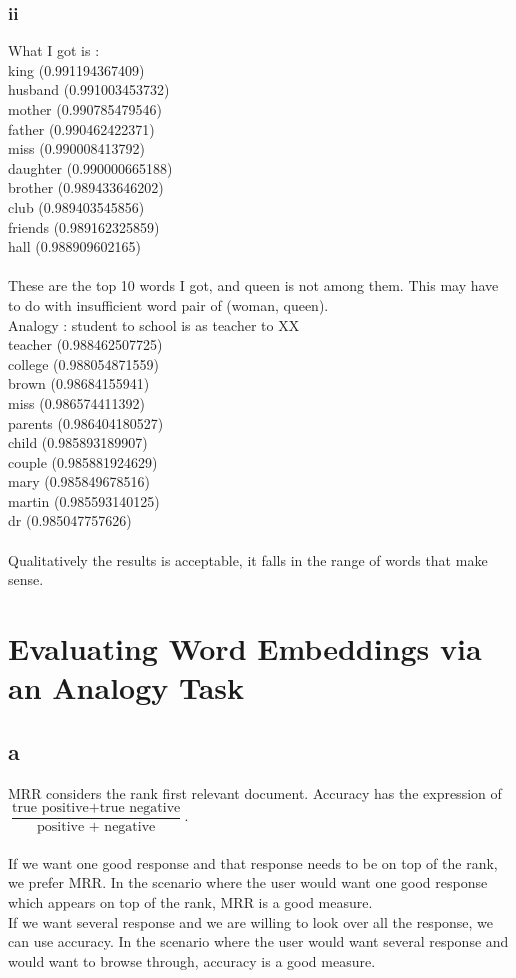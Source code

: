 \subsubsection{ii}
What I got is : \\
king (0.991194367409) \\
husband (0.991003453732)\\
mother (0.990785479546)\\
father (0.990462422371)\\
miss (0.990008413792)\\
daughter (0.990000665188)\\
brother (0.989433646202)\\
club (0.989403545856)\\
friends (0.989162325859) \\
hall (0.988909602165) \\
\\
These are the top 10 words I got, and queen is not among them. This may have to do with insufficient word pair of (woman, queen).
\\
Analogy  : student to school is as teacher to XX \\
teacher (0.988462507725)\\
college (0.988054871559)\\
brown (0.98684155941)\\
miss (0.986574411392)\\
parents (0.986404180527)\\
child (0.985893189907)\\
couple (0.985881924629)\\
mary (0.985849678516)\\
martin (0.985593140125)\\
dr (0.985047757626)\\
\\ 
Qualitatively the results is acceptable, it falls in the range of words that make sense.

\section{Evaluating Word Embeddings via an Analogy Task}
\subsection{a}
MRR considers the rank first relevant document.  Accuracy has the expression of $\dfrac{\text{true positive}+\text{true negative}}{\text{positive + negative}}$. \\ \\
If we want one good response and that response needs to be on top of the rank, we prefer MRR. In the scenario where the user would want one good response which appears on top of the rank, MRR is a good measure. \\
If we want several response and we are willing to look over all the response, we can use accuracy. In the scenario where the user would want several response and would want to browse through, accuracy is a good measure.

